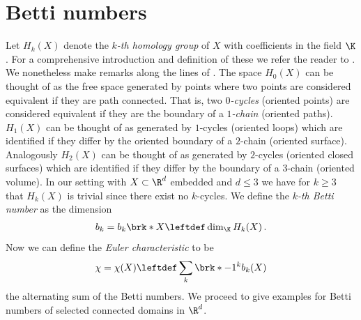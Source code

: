 \section{Betti numbers}


Let $H_k(X)$ denote the \emph{$k$-th homology group} of $X$ with coefficients in the field $\K$.
For a comprehensive introduction and definition of these we refer the reader to \cite[Chapter 2]{Hatcher2002}.
We nonetheless make remarks along the lines of \cite{Cantarella2002}.
The space $H_0(X)$ can be thought of as the free space generated by points where two points
are considered equivalent if they are path connected. That is, two \emph{$0$-cycles} (oriented points) are considered equivalent if
they are the boundary of a \emph{$1$-chain} (oriented paths).
$H_1(X)$ can be thought of as generated by $1$-cycles (oriented loops) which are identified if they differ by the oriented boundary of a $2$-chain (oriented surface).
Analogously $H_2(X)$ can be thought of as generated by $2$-cycles (oriented closed surfaces) which are identified if they
differ by the boundary of a $3$-chain (oriented volume).
In our setting with $X\subset\R^d$ embedded and $d\leq3$ we have for $k\geq3$ that $H_k(X)$ is trivial since there exist no $k$-cycles.
We define the \emph{$k$-th Betti number} as the dimension
\begin{align}
  b_k=b_k\brk*{X}\leftdef\dim_\K H_k(X)\,.\label{eq:df_bettiNbrs}
\end{align}
%
Now we can define the \emph{Euler characteristic} to be
\begin{align}
  \chi=\chi(X)\leftdef\sum_{k}\brk*{-1}^{k}b_k(X)\label{eq:Morse_Euler}
\end{align}
the alternating sum of the Betti numbers.
% 
We proceed to give examples for Betti numbers of selected connected domains in $\R^d$.
% 
